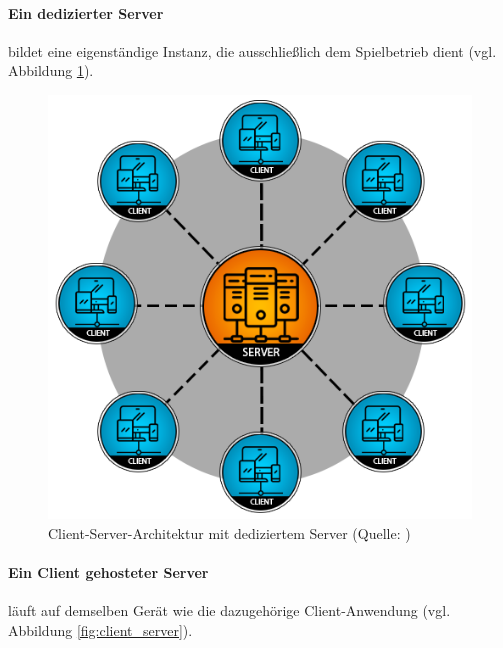 \paragraph{Ein dedizierter Server} bildet eine eigenständige Instanz, die ausschließlich dem Spielbetrieb dient (vgl. Abbildung \ref{fig:dedicated_server}).

\begin{figure}[ht]
\centering
\includegraphics[width=1\linewidth]{content/pictures/ded_server-d5369721966357b9b4d5e1fa96b05b22.png}
\caption{Client-Server-Architektur mit dediziertem Server (Quelle: \cite{noauthor_network_2024})}
\label{fig:dedicated_server}
\end{figure}

\paragraph{Ein Client gehosteter Server} läuft auf demselben Gerät wie die dazugehörige Client-Anwendung (vgl. Abbildung \ref{fig:client_server}).

